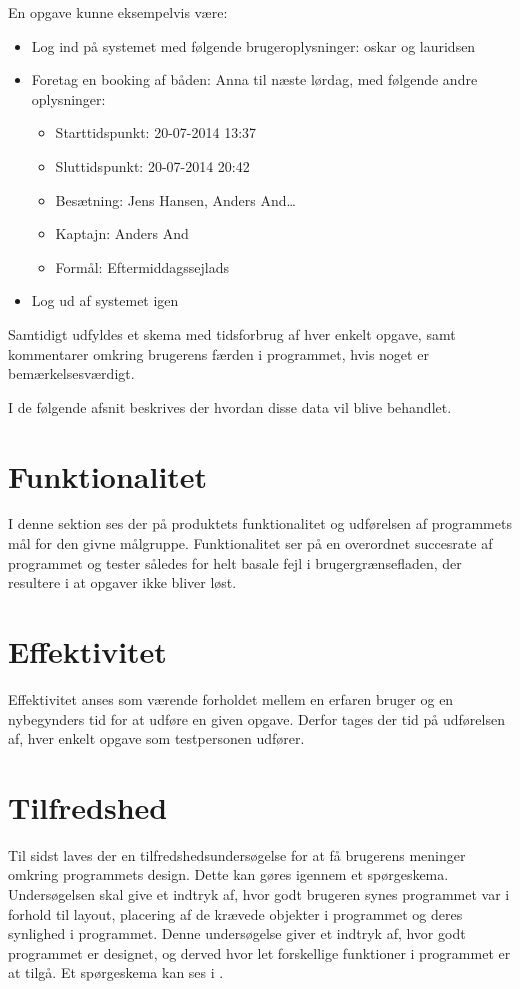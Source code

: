 En opgave kunne eksempelvis være:
\begin{itemize}
	\item Log ind på systemet med følgende brugeroplysninger: oskar og lauridsen
	\item Foretag en booking af båden: Anna til næste lørdag, med følgende andre oplysninger: 
	\begin{itemize}
		\item Starttidspunkt: 20-07-2014 13:37
		\item Sluttidspunkt: 20-07-2014 20:42
		\item Besætning: Jens Hansen, Anders And\ldots
		\item Kaptajn: Anders And
		\item Formål: Eftermiddagssejlads
	\end{itemize}
	\item Log ud af systemet igen
\end{itemize}

Samtidigt udfyldes et skema med tidsforbrug af hver enkelt opgave, samt kommentarer omkring brugerens færden i programmet, hvis noget er bemærkelsesværdigt. 

I de følgende afsnit beskrives der hvordan disse data vil blive behandlet.

\section{Funktionalitet}
I denne sektion ses der på produktets funktionalitet og udførelsen af programmets mål for den givne målgruppe.
Funktionalitet ser på en overordnet succesrate af programmet og tester således for helt basale fejl i brugergrænsefladen, der resultere i at opgaver ikke bliver løst. 

\section{Effektivitet}
Effektivitet anses som værende forholdet mellem en erfaren bruger og en nybegynders tid for at udføre en given opgave.\citep{UIEffeciency}
Derfor tages der tid på udførelsen af, hver enkelt opgave som testpersonen udfører.

\section{Tilfredshed}
Til sidst laves der en tilfredshedsundersøgelse for at få brugerens meninger omkring programmets design. 
Dette kan gøres igennem et spørgeskema. 
Undersøgelsen skal give et indtryk af, hvor godt brugeren synes programmet var i forhold til layout, placering af de krævede objekter i programmet og deres synlighed i programmet. 
Denne undersøgelse giver et indtryk af, hvor godt programmet er designet, og derved hvor let forskellige funktioner i programmet er at tilgå. 
Et spørgeskema kan ses i . \citep{UISatisfaction}
